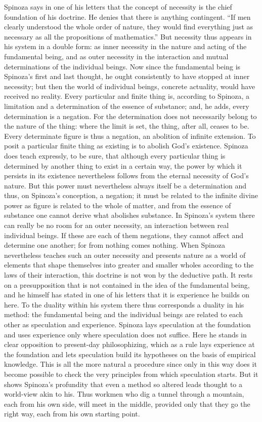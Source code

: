 \documentclass[12pt]{book}
\newcommand{\opage}[1]{\marginnote{\footnotesize\textit{[#1]}}}
\begin{document}
Spinoza says in one of his letters that the concept of necessity is the chief
foundation of his doctrine. He denies that there is anything contingent. ``If men
clearly understood the whole order of nature, they would find everything just as
necessary as all the propositions of mathematics.'' But necessity thus appears in his
system in a double form: as inner necessity in the nature and acting of the fundamental
being, and as outer necessity in the interaction and mutual determinations of the
individual beings. Now since the fundamental being is Spinoza's first and last thought,
he ought consistently to have stopped at inner necessity; but then the world of
individual beings, concrete actuality, would have received no reality. Every particular
and finite thing is, according to Spinoza, a limitation and a determination of the
essence of substance; and, he adds, every determination is a negation. For the
determination does not necessarily belong to the nature of the thing: where the limit
is set, the thing, after all, ceases to be. Every determinate figure is thus a negation,
an abolition of infinite extension. To posit a particular finite thing as existing is to
abolish God's existence. Spinoza does teach expressly, to be sure, that although every
particular thing is determined by another thing \opage{86}to exist in a certain way, the
power by which it persists in its existence nevertheless follows from the eternal
necessity of God's nature. But this power must nevertheless always itself be a
determination and thus, on Spinoza's conception, a negation; it must be related to the
infinite divine power as figure is related to the whole of matter, and from the essence
of substance one cannot derive what abolishes substance. In Spinoza's system there can
really be no room for an outer necessity, an interaction between real individual beings.
If these are each of them negations, they cannot affect and determine one another; for
from nothing comes nothing. When Spinoza nevertheless teaches such an outer necessity
and presents nature as a world of elements that shape themselves into greater and
smaller wholes according to the laws of their interaction, this doctrine is not won by
the deductive path. It rests on a presupposition that is not contained in the idea of
the fundamental being, and he himself has stated in one of his letters that it is
experience he builds on here. To the duality within his system there thus corresponds a
duality in his method: the fundamental being and the individual beings are related to
each other as speculation and experience. Spinoza lays speculation at the foundation and
uses experience only where speculation does not suffice. Here he stands in clear
opposition to present-day philosophizing, which as a rule lays experience at the
foundation and lets speculation build its hypotheses on the basis of empirical
knowledge. This is all the more natural a procedure since only in this way does it
become possible to check the very \opage{87}principles from which speculation starts.
But it shows Spinoza's profundity that even a method so altered leads thought to a
world-view akin to his. Thus workmen who dig a tunnel through a mountain, each from his
own side, will meet in the middle, provided only that they go the right way, each from
his own starting point.
\end{document}
